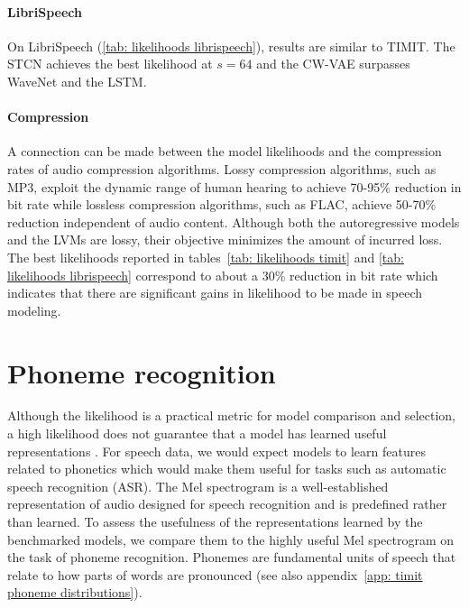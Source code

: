 \paragraph{LibriSpeech}
On LibriSpeech (\cref{tab: likelihoods librispeech}), results are similar to TIMIT. The STCN achieves the best likelihood at $s=64$ and the CW-VAE surpasses WaveNet and the LSTM. 
\paragraph{Compression}
A connection can be made between the model likelihoods and the compression rates of audio compression algorithms. 
Lossy compression algorithms, such as MP3, exploit the dynamic range of human hearing to achieve 70-95\% reduction in bit rate \cite{brandenburg_mpeg-2_1998} while lossless compression algorithms, such as FLAC, achieve 50-70\% reduction \cite{coalson_free_2019} independent of audio content. 
Although both the autoregressive models and the LVMs are lossy, their objective minimizes the amount of incurred loss. 
The best likelihoods reported in tables~\cref{tab: likelihoods timit} and \cref{tab: likelihoods librispeech} correspond to about a 30\% reduction in bit rate which indicates that there are significant gains in likelihood to be made in speech modeling.

\section{Phoneme recognition}\label{sec: phoneme recognition}
Although the likelihood is a practical metric for model comparison and selection, a high likelihood does not guarantee that a model has learned useful representations \cite{huszar_is_2017}. 
For speech data, we would expect models to learn features related to phonetics which would make them useful for tasks such as automatic speech recognition (ASR). 
The Mel spectrogram is a well-established representation of audio designed for speech recognition and is predefined rather than learned. %
To assess the usefulness of the representations learned by the benchmarked models, we compare them to the highly useful Mel spectrogram on the task of phoneme recognition. 
Phonemes are fundamental units of speech that relate to how parts of words are pronounced (see also appendix~\cref{app: timit phoneme distributions}).

